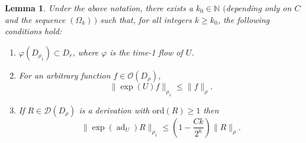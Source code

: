 \documentclass[10pt,twoside,reqno]{amsart}
\newtheorem{lemma}[thm]{Lemma}
\theoremstyle{remark}
\theoremstyle{remark}
\newcommand{\N}{\mathbb{N}}
\newcommand{\tmop}[1]{{\operatorname{#1}}}
\newenvironment{enumeratenumeric}{\begin{enumerate}[1.] }{\end{enumerate}}
\newcommand{\ord}{\mathrm{ord}}
\newcommand{\oO}{\mathcal{O}}
\newcommand{\cD}{\mathcal{D}}
\begin{document}
\begin{lemma}\label{lemma-bound-expU}
  Under the above notation, there exists a $k_0 \in \mathbb{N}$ $($depending only on $C$ and the sequence $(\Omega_k)\, )$ such that,
  for all integers $k \geq k_0$, the following conditions hold:
  \begin{enumeratenumeric}
    \item $\varphi (D_{\rho_1}) \subset D_r$, where $\varphi$ is the time-1
    flow of $U$. 
    \item For an arbitrary function $f \in \oO (D_{\rho})$, \ \
    \[ \| \exp (U) f \|_{\rho_1} \leq \| f \|_{\rho}. \]
    \item If $R \in \cD (D_{\rho})$ is a derivation with $\ord (R) \geq
    1$ then
        \[ \| \exp (\tmop{ad}_U) R \|_{\rho_1} \leqslant \left( 1 - \frac{C k}{2^k}
   \right)  \| R \|_{\rho}. \]
 \end{enumeratenumeric}
\end{lemma}
\end{document}
